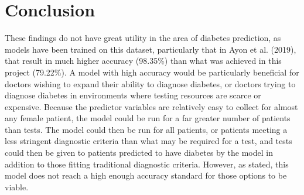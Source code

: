 \section{Conclusion}

These findings do not have great utility in the area of diabetes prediction, as models have been trained on this dataset, particularly that in Ayon et al. (2019), that result in much higher accuracy (98.35\%) than what was achieved in this project (79.22\%).
A model with high accuracy would be particularly beneficial for doctors wishing to expand their ability to diagnose diabetes, or doctors trying to diagnose diabetes in environments where testing resources are scarce or expensive.
Because the predictor variables are relatively easy to collect for almost any female patient, the model could be run for a far greater number of patients than tests.
The model could then be run for all patients, or patients meeting a less stringent diagnostic criteria than what may be required for a test, and tests could then be given to patients predicted to have diabetes by the model in addition to those fitting traditional diagnostic criteria.
However, as stated, this model does not reach a high enough accuracy standard for those options to be viable.